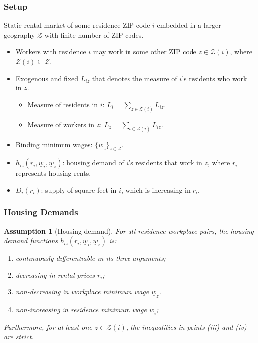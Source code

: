 \documentclass[aspectratio=169, t]{beamer}
\newtheorem{assu}{Assumption}
\newcommand{\Z}{\mathcal{Z}}
\newcommand{\MW}{\underline{w}}
\begin{document}
\begin{frame}
    \frametitle{Setup}
    
    Static rental market of some residence ZIP code $i$ embedded in a larger geography 
    $\Z$ with finite number of ZIP codes.    
    \begin{itemize}
		\item Workers with residence $i$ may work in some other ZIP code $z\in\Z(i)$, where 
		$\Z(i)\subseteq\Z$.

		\pause
		\vspace{2mm}
		\item Exogenous and fixed $L_{iz}$ that denotes the measure of $i$'s residents who work in $z$.
		\begin{itemize}
			\item Measure of residents in $i$: $L_i = \sum_{z \in \Z(i)} L_{iz}$.
			\item Measure of workers in $z$: $L_z = \sum_{i \in \Z(i)} L_{iz}$.
		\end{itemize}
	
		\pause
		\item Binding minimum wages: $\{\MW_z\}_{z\in\Z}$.
		
		\pause
		\vspace{2mm}
		\item $h_{i z} (r_i, \MW_i, \MW_z)$: housing demand of $i$'s residents that work in $z$, where $r_i$ 
		represents housing rents.

		\pause
		\vspace{2mm}
		\item $D_i \left(r_i \right)$: supply of square feet in $i$, which is increasing in $r_i$.

	\end{itemize}
\end{frame}

\begin{frame}
    \frametitle{Housing Demands}
   
\begin{assu}[Housing demand]\label{assu:housing_function}
    For all residence-workplace pairs, the housing demand functions $h_{iz} (r_i, 	
    \MW_i, \MW_z)$ is:
    \begin{enumerate}
        \item continuously differentiable in its three arguments;
        \item decreasing in rental prices $r_i$;
        \item non-decreasing in workplace minimum wage $\MW_z$.
        \item non-increasing in residence minimum wage $\MW_i$;
    \end{enumerate}
    Furthermore, for at least one $z\in\Z(i)$, the inequalities in points (iii)
    and (iv) are strict.
\end{assu}
\end{frame}
\end{document}
